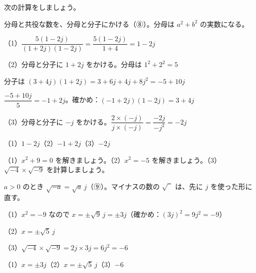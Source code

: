 \begin{reidai}[わり算]
次の計算をしましょう。\newline{}\par
\kangaekata 分母と共役な数を、分母と分子にかける（⑧）。分母は $a^2+b^2$ の実数になる。\par
\shiki{}\zw{} （1）$\dfrac{5(1-2j)}{(1+2j)(1-2j)}=\dfrac{5(1-2j)}{1+4}=1-2j$\par
\bkviiq （2）分母と分子に $1+2j$ をかける。分母は $1^2+2^2=5$\par
\bkviib 分子は $(3+4j)(1+2j)=3+6j+4j+8j^2=-5+10j$\par
\bkviib $\dfrac{-5+10j}{5}=-1+2j$。確かめ：$(-1+2j)(1-2j)=3+4j$\par
\bkviiq （3）分母と分子に $-j$ をかける。$\dfrac{2\times(-j)}{j\times(-j)}=\dfrac{-2j}{-j^2}=-2j$\par
\kotae{}\zw{} （1）$1-2j$\quad（2）$-1+2j$\quad（3）$-2j$
\end{reidai}

\begin{reidai}[$x^2=-a$ の形と、マイナスの数の $\sqrt{\phantom{2}}$]
（1）$x^2+9=0$ を解きましょう。\newline（2）$x^2=-5$ を解きましょう。\newline（3）$\sqrt{-4}\times\sqrt{-9}$ を計算しましょう。\par
\kangaekata $a>0$ のとき $\sqrt{-a}=\sqrt a\,j$（⑨）。マイナスの数の $\sqrt{\phantom{2}}$ は、先に $j$ を使った形に直す。\par
\shiki{}\zw{} （1）$x^2=-9$ なので $x=\pm\sqrt9\,j=\pm3j$（確かめ：$(3j)^2=9j^2=-9$）\par
\bkviiq （2）$x=\pm\sqrt5\,j$\par
\bkviiq （3）$\sqrt{-4}\times\sqrt{-9}=2j\times3j=6j^2=-6$\par
\kotae{}\zw{} （1）$x=\pm3j$\quad（2）$x=\pm\sqrt5\,j$\quad（3）$-6$
\end{reidai}

